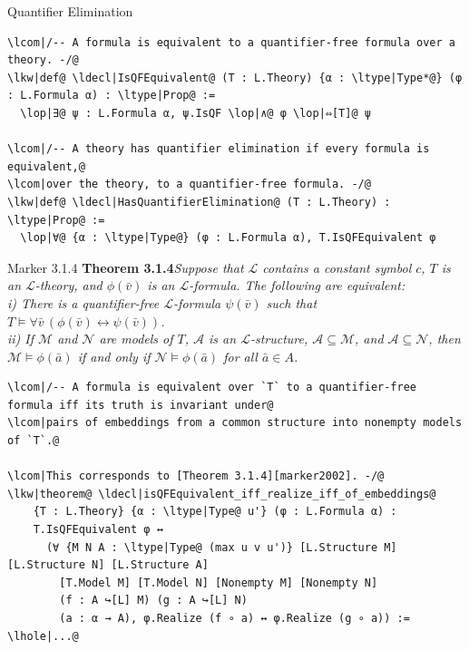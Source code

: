 \documentclass[aspectratio=169,11pt]{beamer}
\newcommand{\lcom}[1]{\textcolor{leanComment}{#1}}
\newcommand{\lkw}[1]{\textcolor{leanKeyword}{\textbf{#1}}}
\newcommand{\ldecl}[1]{\textcolor{leanDecl}{#1}}
\newcommand{\ltype}[1]{\textcolor{leanType}{#1}}
\newcommand{\lop}[1]{\textcolor{leanOperator}{#1}}
\newcommand{\lhole}[1]{\textcolor{leanHole}{#1}}
\begin{document}
\begin{frame}[fragile]{Quantifier Elimination}
\begin{Verbatim}[fontsize=\scriptsize,commandchars=\\\|\@]
\lcom|/-- A formula is equivalent to a quantifier-free formula over a theory. -/@
\lkw|def@ \ldecl|IsQFEquivalent@ (T : L.Theory) {α : \ltype|Type*@} (φ : L.Formula α) : \ltype|Prop@ :=
  \lop|∃@ ψ : L.Formula α, ψ.IsQF \lop|∧@ φ \lop|⇔[T]@ ψ

\lcom|/-- A theory has quantifier elimination if every formula is equivalent,@
\lcom|over the theory, to a quantifier-free formula. -/@
\lkw|def@ \ldecl|HasQuantifierElimination@ (T : L.Theory) : \ltype|Prop@ :=
  \lop|∀@ {α : \ltype|Type@} (φ : L.Formula α), T.IsQFEquivalent φ
\end{Verbatim}
\end{frame}

\begin{frame}[fragile,t]{Marker 3.1.4}
\vspace{0.7em}
{\color{black}\rmfamily\fontsize{7.1}{8.2}\selectfont
{\bfseries Theorem 3.1.4}\quad \itshape Suppose that \(\mathcal{L}\) contains a constant symbol \(c\), \(T\) is an
\(\mathcal{L}\)-theory, and \(\phi(\bar{v})\) is an \(\mathcal{L}\)-formula.
The following are equivalent:\\[0.2em]
i) There is a quantifier-free \(\mathcal{L}\)-formula \(\psi(\bar{v})\) such that
\(T \models \forall \bar{v}\,(\phi(\bar{v}) \leftrightarrow \psi(\bar{v}))\).\\[0.2em]
ii) If \(\mathcal{M}\) and \(\mathcal{N}\) are models of \(T\), \(\mathcal{A}\) is an
\(\mathcal{L}\)-structure, \(\mathcal{A} \subseteq \mathcal{M}\), and
\(\mathcal{A} \subseteq \mathcal{N}\), then
\(\mathcal{M} \models \phi(\bar{a})\) if and only if
\(\mathcal{N} \models \phi(\bar{a})\) for all \(\bar{a} \in A\).
}

\vspace{0.35em}
\begin{Verbatim}[fontsize=\tiny,commandchars=\\\|\@]
\lcom|/-- A formula is equivalent over `T` to a quantifier-free formula iff its truth is invariant under@
\lcom|pairs of embeddings from a common structure into nonempty models of `T`.@

\lcom|This corresponds to [Theorem 3.1.4][marker2002]. -/@
\lkw|theorem@ \ldecl|isQFEquivalent_iff_realize_iff_of_embeddings@
    {T : L.Theory} {α : \ltype|Type@ u'} (φ : L.Formula α) :
    T.IsQFEquivalent φ ↔
      (∀ {M N A : \ltype|Type@ (max u v u')} [L.Structure M] [L.Structure N] [L.Structure A]
        [T.Model M] [T.Model N] [Nonempty M] [Nonempty N]
        (f : A ↪[L] M) (g : A ↪[L] N)
        (a : α → A), φ.Realize (f ∘ a) ↔ φ.Realize (g ∘ a)) := \lhole|...@
\end{Verbatim}
\end{frame}
\end{document}

